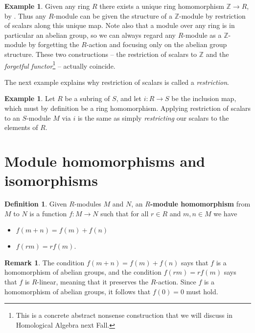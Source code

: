 \documentclass[12pt]{report}
\numberwithin{equation}{section}
\numberwithin{theorem}{chapter}
\theoremstyle{definition}
\newtheorem{definition}[theorem]{Definition}
\newtheorem{example}[theorem]{Example}
\newtheorem*{basic properties}{Basic Properties}
\newtheorem*{Important Remark}{Important Remark}
\newtheorem{remark}[theorem]{Remark}
\newcommand{\df}[1]{{\bf #1}\index{#1}}
\begin{document}
\begin{example}
Given any ring $R$ there exists a unique ring homomorphism $\mathbb{Z} \to R$, by . Thus any $R$-module can be given the structure of a $\mathbb{Z}$-module by restriction of scalars along this unique map. Note also that a module over any ring is in particular an abelian group, so we can always regard any $R$-module as a $\mathbb{Z}$-module by forgetting the $R$-action and focusing only on the abelian group structure. These two constructions -- the restriction of scalars to $\mathbb{Z}$ and the \emph{forgetful functor}\footnote{This is a concrete abstract nonsense construction that we will discuss in Homological Algebra next Fall.} -- actually coincide.
\end{example}

The next example explains why restriction of scalars is called a \emph{restriction}.

\begin{example}
	Let $R$ be a subring of $S$, and let $i\!: R \to S$ be the inclusion map, which must by definition be a ring homomorphism. Applying restriction of scalars to an $S$-module $M$ via $i$ is the same as simply \emph{restricting} our scalars to the elements of $R$.
\end{example}





\section{Module homomorphisms and isomorphisms}


\begin{definition}
	Given $R$-modules $M$ and $N$, an \df{$R$-module homomorphism} from $M$ to $N$ is a function $f\!: M \to N$ such that for all $r \in R$ and $m,n \in M$ we have
\begin{itemize}
\item $f(m+n)=f(m)+f(n)$
\item $f(rm) = rf(m)$.
\end{itemize}
\end{definition}


\begin{remark}
	The condition $f(m+n)=f(m)+f(n)$ says that $f$ is a homomorphism of abelian groups, and the condition $f(rm) = rf(m)$ says that $f$ is $R$-linear, meaning that it preserves the $R$-action. Since $f$ is a homomorphism of abelian groups, it follows that $f(0) = 0$ must hold.
\end{remark}
\end{document}
